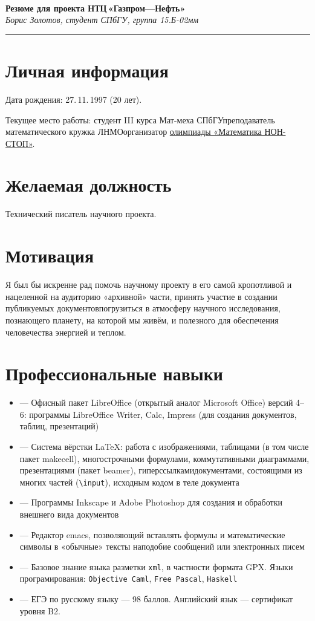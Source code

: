 \documentclass[11pt,a4paper]{article}
\def\sec#1{\section{#1} \vspace{-0.22cm}}
\begin{document}
\ \vspace{-1.5cm}


\begin{center}
{\LARGE\bf Резюме для проекта НТЦ\,«Газпром—Нефть»} \\ \smallskip
{\large\it Борис Золотов, студент СПбГУ, группа 15.Б-02мм}
\end{center}\vspace{1mm}\hrule\vspace{2mm}



\sec{Личная информация}
\noindent Дата рождения: 27.\,11.\,1997 (20 лет).

\ms Текущее место работы: студент III курса Мат-меха СПбГУ\scolon преподаватель математического кружка ЛНМО\scolon организатор \href{http://mathnonstop.ru/}{олимпиады «Математика НОН-СТОП»}.



\sec{Желаемая должность}
\noindent Технический писатель научного проекта.



\sec{Мотивация}
\noindent Я был бы искренне рад помочь научному проекту в его самой кропотливой и нацеленной на аудиторию «архивной» части, принять участие в создании публикуемых документов\scolon погрузиться в атмосферу научного исследования, познающего планету, на которой мы живём, и полезного для обеспечения человечества энергией и теплом.



\sec{Профессиональные навыки}
\def\ite{\item[—]}

\begin{itemize}
\setlength\itemsep{0.2ex}

\ite Офисный пакет {\sffamily LibreOffice} (открытый аналог {\sffamily Microsoft Office}) версий 4–6: программы {\sffamily LibreOffice} {\sffamily Writer}, {\sffamily Calc}, {\sffamily Impress} (для создания документов, таблиц, презентаций)\scolon

\ite Система вёрстки \LaTeX: работа с изображениями, таблицами (в том числе пакет {\sffamily makecell}), многострочными формулами, коммутативными диаграммами, презентациями (пакет {\sffamily beamer}), гиперссылками\scolon документами, состоящими из многих частей ({\tt\textbackslash input}), исходным кодом в теле документа\scolon

\ite Программы {\sffamily Inkscape} и {\sffamily Adobe Photoshop} для создания и обработки внешнего вида документов\scolon

\ite Редактор {\sffamily emacs}, позволяющий вставлять формулы и математические символы в «обычные» тексты наподобие сообщений или электронных писем\scolon

\ite Базовое знание языка разметки {\tt xml}, в частности формата {\sffamily GPX}. Языки програмирования: {\tt Objective Caml}, {\tt Free Pascal}, {\tt Haskell}\scolon

\ite ЕГЭ по русскому языку — 98 баллов. Английский язык — сертификат уровня B2.
\end{itemize}
\end{document}
